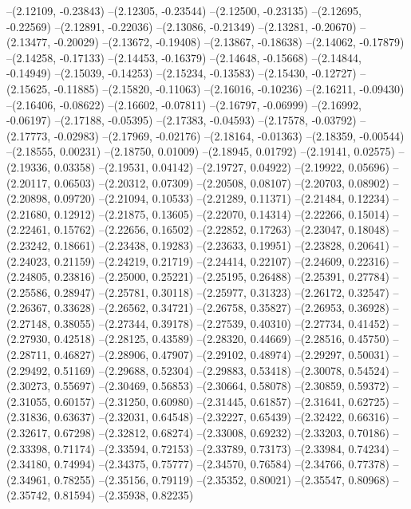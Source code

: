 --(2.12109, -0.23843)
--(2.12305, -0.23544)
--(2.12500, -0.23135)
--(2.12695, -0.22569)
--(2.12891, -0.22036)
--(2.13086, -0.21349)
--(2.13281, -0.20670)
--(2.13477, -0.20029)
--(2.13672, -0.19408)
--(2.13867, -0.18638)
--(2.14062, -0.17879)
--(2.14258, -0.17133)
--(2.14453, -0.16379)
--(2.14648, -0.15668)
--(2.14844, -0.14949)
--(2.15039, -0.14253)
--(2.15234, -0.13583)
--(2.15430, -0.12727)
--(2.15625, -0.11885)
--(2.15820, -0.11063)
--(2.16016, -0.10236)
--(2.16211, -0.09430)
--(2.16406, -0.08622)
--(2.16602, -0.07811)
--(2.16797, -0.06999)
--(2.16992, -0.06197)
--(2.17188, -0.05395)
--(2.17383, -0.04593)
--(2.17578, -0.03792)
--(2.17773, -0.02983)
--(2.17969, -0.02176)
--(2.18164, -0.01363)
--(2.18359, -0.00544)
--(2.18555, 0.00231)
--(2.18750, 0.01009)
--(2.18945, 0.01792)
--(2.19141, 0.02575)
--(2.19336, 0.03358)
--(2.19531, 0.04142)
--(2.19727, 0.04922)
--(2.19922, 0.05696)
--(2.20117, 0.06503)
--(2.20312, 0.07309)
--(2.20508, 0.08107)
--(2.20703, 0.08902)
--(2.20898, 0.09720)
--(2.21094, 0.10533)
--(2.21289, 0.11371)
--(2.21484, 0.12234)
--(2.21680, 0.12912)
--(2.21875, 0.13605)
--(2.22070, 0.14314)
--(2.22266, 0.15014)
--(2.22461, 0.15762)
--(2.22656, 0.16502)
--(2.22852, 0.17263)
--(2.23047, 0.18048)
--(2.23242, 0.18661)
--(2.23438, 0.19283)
--(2.23633, 0.19951)
--(2.23828, 0.20641)
--(2.24023, 0.21159)
--(2.24219, 0.21719)
--(2.24414, 0.22107)
--(2.24609, 0.22316)
--(2.24805, 0.23816)
--(2.25000, 0.25221)
--(2.25195, 0.26488)
--(2.25391, 0.27784)
--(2.25586, 0.28947)
--(2.25781, 0.30118)
--(2.25977, 0.31323)
--(2.26172, 0.32547)
--(2.26367, 0.33628)
--(2.26562, 0.34721)
--(2.26758, 0.35827)
--(2.26953, 0.36928)
--(2.27148, 0.38055)
--(2.27344, 0.39178)
--(2.27539, 0.40310)
--(2.27734, 0.41452)
--(2.27930, 0.42518)
--(2.28125, 0.43589)
--(2.28320, 0.44669)
--(2.28516, 0.45750)
--(2.28711, 0.46827)
--(2.28906, 0.47907)
--(2.29102, 0.48974)
--(2.29297, 0.50031)
--(2.29492, 0.51169)
--(2.29688, 0.52304)
--(2.29883, 0.53418)
--(2.30078, 0.54524)
--(2.30273, 0.55697)
--(2.30469, 0.56853)
--(2.30664, 0.58078)
--(2.30859, 0.59372)
--(2.31055, 0.60157)
--(2.31250, 0.60980)
--(2.31445, 0.61857)
--(2.31641, 0.62725)
--(2.31836, 0.63637)
--(2.32031, 0.64548)
--(2.32227, 0.65439)
--(2.32422, 0.66316)
--(2.32617, 0.67298)
--(2.32812, 0.68274)
--(2.33008, 0.69232)
--(2.33203, 0.70186)
--(2.33398, 0.71174)
--(2.33594, 0.72153)
--(2.33789, 0.73173)
--(2.33984, 0.74234)
--(2.34180, 0.74994)
--(2.34375, 0.75777)
--(2.34570, 0.76584)
--(2.34766, 0.77378)
--(2.34961, 0.78255)
--(2.35156, 0.79119)
--(2.35352, 0.80021)
--(2.35547, 0.80968)
--(2.35742, 0.81594)
--(2.35938, 0.82235)
